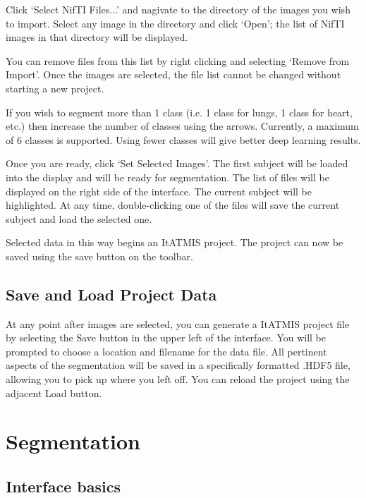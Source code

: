 \documentclass[twoside,a4paper]{refart}
\begin{document}
Click `Select NifTI Files...' and nagivate to the directory of the images you wish to import. Select any image in the directory and click `Open'; the list of NifTI images in that directory will be displayed.

You can remove files from this list by right clicking and selecting `Remove from Import'. Once the images are selected, the file list cannot be changed without starting a new project.

If you wish to segment more than 1 class (i.e. 1 class for lungs, 1 class for heart, etc.) then increase the number of classes using the arrows. Currently, a maximum of 6 classes is supported. Using fewer classes will give better deep learning results.

Once you are ready, click `Set Selected Images'. The first subject will be loaded into the display and will be ready for segmentation. The list of files will be displayed on the right side of the interface. The current subject will be highlighted. At any time, double-clicking one of the files will save the current subject and load the selected one.

Selected data in this way begins an ItATMIS project. The project can now be saved using the save button on the toolbar.


\subsection{Save and Load Project Data}

At any point after images are selected, you can generate a ItATMIS project file by selecting the Save button in the upper left of the interface. You will be prompted to choose a location and filename for the data file. All pertinent aspects of the segmentation will be saved in a specifically formatted .HDF5 file, allowing you to pick up where you left off. You can reload the project using the adjacent Load button.




\section{Segmentation}


\subsection{Interface basics}
\end{document}
